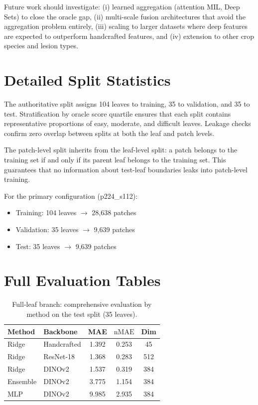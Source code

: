 \documentclass[11pt,a4paper]{article}
\newcommand{\nMAE}{\mathrm{nMAE}}
\begin{document}
Future work should investigate: (i) learned aggregation (attention MIL, Deep Sets) to close the oracle gap, (ii) multi-scale fusion architectures that avoid the aggregation problem entirely, (iii) scaling to larger datasets where deep features are expected to outperform handcrafted features, and (iv) extension to other crop species and lesion types.

\pagebreak

\appendix

\section{Detailed Split Statistics}
\label{app:splits}

The authoritative split assigns 104 leaves to training, 35 to validation, and 35 to test.
Stratification by oracle score quartile ensures that each split contains representative proportions of easy, moderate, and difficult leaves.
Leakage checks confirm zero overlap between splits at both the leaf and patch levels.

The patch-level split inherits from the leaf-level split: a patch belongs to the training set if and only if its parent leaf belongs to the training set.
This guarantees that no information about test-leaf boundaries leaks into patch-level training.

For the primary configuration (p224\_s112):
\begin{itemize}[nosep]
    \item Training: 104 leaves $\rightarrow$ 28{,}638 patches
    \item Validation: 35 leaves $\rightarrow$ 9{,}639 patches
    \item Test: 35 leaves $\rightarrow$ 9{,}639 patches
\end{itemize}

\section{Full Evaluation Tables}
\label{app:eval}

\begin{table}[h]
\centering
\caption{Full-leaf branch: comprehensive evaluation by method on the test split (35 leaves).}
\label{tab:fl_full}
\begin{tabular}{llccc}
\toprule
Method & Backbone & MAE & $\nMAE$ & Dim \\
\midrule
Ridge & Handcrafted & 1.392 & 0.253 & 45 \\
Ridge & ResNet-18 & 1.368 & 0.283 & 512 \\
Ridge & DINOv2 & 1.537 & 0.319 & 384 \\
Ensemble & DINOv2 & 3.775 & 1.154 & 384 \\
MLP & DINOv2 & 9.985 & 2.935 & 384 \\
\bottomrule
\end{tabular}
\end{table}
\end{document}
